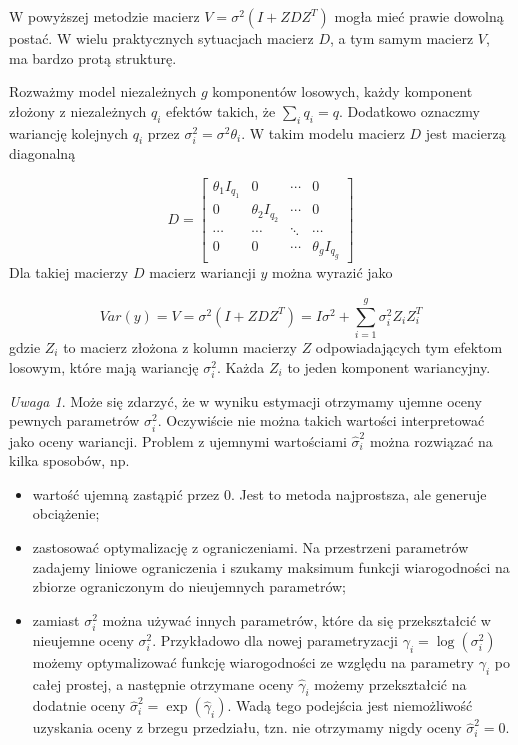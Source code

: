 \documentclass[12pt]{mwbk}
\theoremstyle{plain}
\theoremstyle{definition}
\theoremstyle{remark}
\newtheorem{uwaga}{Uwaga}[chapter]
\begin{document}
W powyższej metodzie macierz $V=\sigma^2(I+ZDZ^T)$ mogła mieć prawie dowolną postać. W wielu praktycznych sytuacjach macierz $D$, a tym samym macierz $V$, ma bardzo protą strukturę.

Rozważmy model niezależnych $g$ komponentów losowych, każdy komponent złożony z niezależnych $q_i$ efektów takich, że $\sum\limits_i q_i=q$. Dodatkowo oznaczmy wariancję kolejnych $q_i$ przez $\sigma^2_i=\sigma^2\theta_i$. W takim modelu macierz $D$ jest macierzą diagonalną

$$D=\begin{bmatrix}
\theta_1I_{q_1} & 0 & \cdots & 0 \\
0 & \theta_2I_{q_2} & \cdots & 0 \\
\cdots & \cdots & \ddots & \cdots \\
0 & 0 & \cdots & \theta_gI_{q_g}
\end{bmatrix}$$
Dla takiej macierzy $D$ macierz wariancji $y$ można wyrazić jako

$$Var(y)=V=\sigma^2(I+ZDZ^T)=I\sigma^2+\sum_{i=1}^{g}\sigma_i^2Z_iZ_i^T$$
gdzie $Z_i$ to macierz złożona z kolumn macierzy $Z$ odpowiadających tym efektom losowym, które mają wariancję $\sigma^2_i$. Każda $Z_i$ to jeden komponent wariancyjny.

\begin{uwaga}
	Może się zdarzyć, że w wyniku estymacji otrzymamy ujemne oceny pewnych parametrów $\sigma_i^2$. Oczywiście nie można takich wartości interpretować jako oceny wariancji. Problem z ujemnymi wartościami $\hat{\sigma}^2_i$ można rozwiązać na kilka sposobów, np.
	\begin{itemize}
		\item wartość ujemną zastąpić przez 0. Jest to metoda najprostsza, ale generuje obciążenie;
		\item zastosować optymalizację z ograniczeniami. Na przestrzeni parametrów zadajemy liniowe ograniczenia i szukamy maksimum funkcji wiarogodności na zbiorze ograniczonym do nieujemnych parametrów;
		\item zamiast $\sigma_i^2$ można używać innych parametrów, które da się przekształcić w nieujemne oceny $\sigma^2_i$. Przykładowo dla nowej parametryzacji $\gamma_i=\log(\sigma^2_i)$ możemy optymalizować funkcję wiarogodności ze względu na parametry $\gamma_i$ po całej prostej, a następnie otrzymane oceny $\hat{\gamma}_i$ możemy przekształcić na dodatnie oceny $\hat{\sigma}_i^2=\exp(\hat{\gamma}_i)$. Wadą tego podejścia jest niemożliwość uzyskania oceny z brzegu przedziału, tzn. nie otrzymamy nigdy oceny $\hat{\sigma}^2_i=0$.
	\end{itemize}
\end{uwaga}
\end{document}
